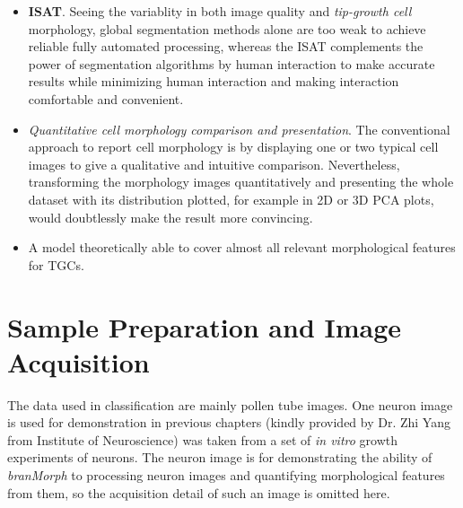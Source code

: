\begin{itemize}
\item \textbf{\ac{ISAT}}. Seeing the variablity in both image quality and \emph{tip-growth cell} morphology, global segmentation methods alone are too weak to achieve reliable fully automated processing, whereas the \ac{ISAT} complements the power of segmentation algorithms by human interaction to make accurate results while minimizing human interaction and making interaction comfortable and convenient.
\item \emph{Quantitative cell morphology comparison and presentation}. The conventional approach to report cell morphology is by displaying one or two typical cell images to give a qualitative and intuitive comparison. Nevertheless, transforming the morphology images quantitatively and presenting the whole dataset with its distribution plotted, for example in 2D or 3D \ac{PCA} plots, would doubtlessly make the result more convincing.
\item A model theoretically able to cover almost all relevant morphological features for \acp{TGC}.
\end{itemize}


\section{Sample Preparation and Image Acquisition}
\label{sec: data}


The data used in classification are mainly pollen tube images. One neuron image is used for demonstration in previous chapters (kindly provided by Dr. Zhi Yang from Institute of Neuroscience) was taken from a set of \emph{in vitro} growth experiments of neurons. The neuron image is for demonstrating the ability of \emph{branMorph} to processing neuron images and quantifying morphological features from them, so the acquisition detail of such an image is omitted here.

